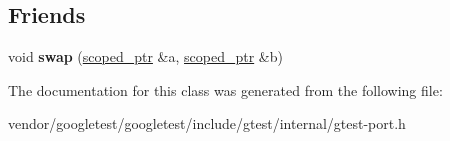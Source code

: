 \subsection*{Friends}
\begin{DoxyCompactItemize}
\item 
void {\bfseries swap} (\hyperlink{classtesting_1_1internal_1_1scoped__ptr}{scoped\+\_\+ptr} \&a, \hyperlink{classtesting_1_1internal_1_1scoped__ptr}{scoped\+\_\+ptr} \&b)\hypertarget{classtesting_1_1internal_1_1scoped__ptr_a01bc0441e6a3ebf26807ac523392ca86}{}\label{classtesting_1_1internal_1_1scoped__ptr_a01bc0441e6a3ebf26807ac523392ca86}

\end{DoxyCompactItemize}


The documentation for this class was generated from the following file\+:\begin{DoxyCompactItemize}
\item 
vendor/googletest/googletest/include/gtest/internal/gtest-\/port.\+h\end{DoxyCompactItemize}
